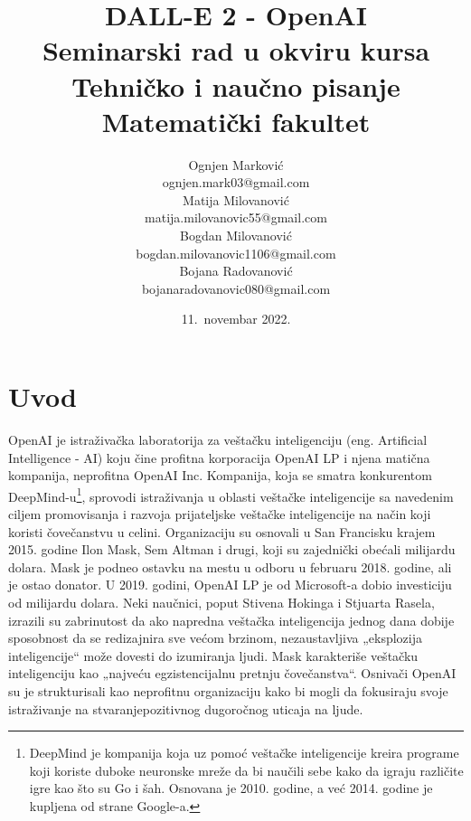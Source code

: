\documentclass[a4paper]{article}
\begin{document}
\title{DALL-E 2 - OpenAI\\ \small{Seminarski rad u okviru kursa\\Tehničko i naučno pisanje\\ Matematički fakultet}}
\author{Ognjen Marković\\ \small{ognjen.mark03@gmail.com}\\ Matija Milovanović\\ \small{matija.milovanovic55@gmail.com}\\ Bogdan Milovanović\\ \small{bogdan.milovanovic1106@gmail.com}\\ Bojana Radovanović\\ \small{bojanaradovanovic080@gmail.com} }
\date{11.~novembar 2022.}
\maketitle
{}
\tableofcontents
\newpage
\section{Uvod}
\label{sec:uvod}
OpenAI je istraživačka laboratorija za veštačku inteligenciju (eng. Artificial Intelligence - AI) koju čine profitna korporacija OpenAI LP i njena matična kompanija, neprofitna OpenAI Inc. Kompanija, koja se smatra konkurentom DeepMind-u\footnote{DeepMind je kompanija koja uz pomoć veštačke inteligencije kreira programe koji koriste duboke neuronske mreže da bi naučili sebe kako da igraju različite igre kao što su Go i šah. Osnovana je 2010. godine, a već 2014. godine je kupljena od strane Google-a.}, sprovodi istraživanja u oblasti veštačke inteligencije sa navedenim ciljem promovisanja i razvoja prijateljske veštačke inteligencije na način koji koristi čovečanstvu u celini. Organizaciju su osnovali u San Francisku krajem 2015. godine Ilon Mask, Sem Altman i drugi, koji su zajednički obećali milijardu dolara. Mask je podneo ostavku na mestu u odboru u februaru 2018. godine, ali je ostao donator. U 2019. godini, OpenAI LP je od Microsoft-a dobio investiciju od milijardu dolara. Neki naučnici, poput Stivena Hokinga i Stjuarta Rasela, izrazili su zabrinutost da ako napredna veštačka inteligencija jednog dana dobije sposobnost da se redizajnira sve većom brzinom, nezaustavljiva „eksplozija inteligencije“ može dovesti do izumiranja ljudi. Mask karakteriše veštačku inteligenciju kao „najveću egzistencijalnu pretnju čovečanstva“. Osnivači OpenAI su je strukturisali kao neprofitnu organizaciju kako bi mogli da fokusiraju svoje istraživanje na stvaranjepozitivnog dugoročnog uticaja na ljude\cite{1}.
\end{document}

